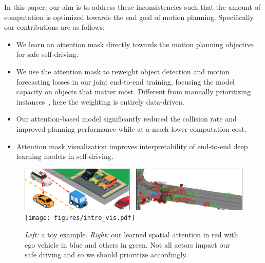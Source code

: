 In this paper, our aim is to address these inconsistencies such that the amount of computation is optimized towards the end goal of motion planning.
Specifically
our contributions are as follows:
\begin{itemize}
\item We learn an attention mask directly towards the motion planning objective for safe self-driving.
\item We use the attention mask to reweight object detection and motion forecasting losses in our
joint end-to-end training, focusing the model capacity on objects that matter most.
Different from manually prioritizing instances~\cite{prioritize}, here the weighting is entirely
data-driven.
\item Our attention-based model significantly reduced the
collision rate and improved planning performance while at a
much lower computation cost.
\item Attention mask visualization improves interpretability of end-to-end deep learning
models in self-driving.
\end{itemize}

\begin{figure}[t]
  \centering
  \iflatexml
  \includegraphics[width=6\textwidth]{figures/intro_vis.png}
  \else
  \texttt{[image: figures/intro\_vis.pdf]}
  \fi
  \caption{\small \textit{Left:} a toy example. \textit{Right:} our learned spatial attention in red with ego vehicle in blue and others in green. Not all actors impact our safe driving and so we should prioritize accordingly.}
  \label{fig:toy}
  \vspace{-0.15in}
\end{figure}